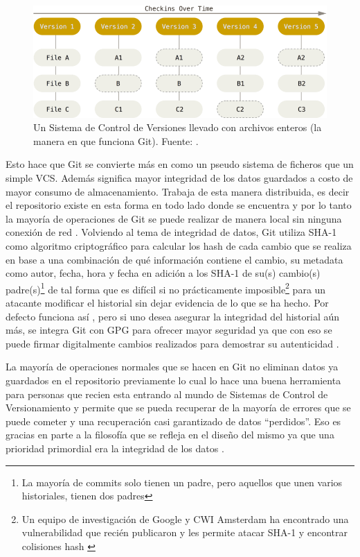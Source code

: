 \begin{figure}
  \begin{center}
      \includegraphics[width=\textwidth]{Figures/vcs-backup.png}
  \end{center}
  \caption{Un Sistema de Control de Versiones llevado con archivos enteros (la manera en que funciona Git). Fuente: \citep{PROGIT-Git-Intro}.}
  \label{VCS-Backup}
\end{figure}

Esto hace que Git se convierte más en como un pseudo sistema de ficheros que un simple VCS. Además significa mayor integridad de los datos guardados a costo de mayor consumo de almacenamiento. Trabaja de esta manera distribuida, es decir el repositorio existe en esta forma en todo lado donde se encuentra y por lo tanto la mayoría de operaciones de Git se puede realizar de manera local sin ninguna conexión de red \citep{PROGIT-Git-Intro}.
Volviendo al tema de integridad de datos, Git utiliza SHA-1 como algoritmo criptográfico para calcular los hash de cada cambio que se realiza en base a una combinación de qué información contiene el cambio, su metadata como autor, fecha, hora y fecha en adición a los SHA-1 de su(s) cambio(s) padre(s)\footnote{La mayoría de commits solo tienen un padre, pero aquellos que unen varios historiales, tienen dos padres} de tal forma que es difícil si no prácticamente imposible\footnote{Un equipo de investigación de Google y CWI Amsterdam ha encontrado una vulnerabilidad que recién publicaron y les permite atacar SHA-1 y encontrar colisiones hash \citep{Shattered-Paper}} para un atacante modificar el historial sin dejar evidencia de lo que se ha hecho. Por defecto funciona así \citep{PROGIT-Git-Intro}, pero si uno desea asegurar la integridad del historial aún más, se integra Git con GPG para ofrecer mayor seguridad ya que con eso se puede firmar digitalmente cambios realizados para demostrar su autenticidad \citep{PROGIT-Git-GPG}.

La mayoría de operaciones normales  que se hacen en Git no eliminan datos ya guardados en el repositorio previamente lo cual lo hace una buena herramienta para personas que recien esta entrando al mundo de Sistemas de Control de Versionamiento y permite que se pueda recuperar de la mayoría de errores que se puede cometer y una recuperación casi garantizado de datos “perdidos”. Eso es gracias en parte a la filosofía que se refleja en el diseño del mismo ya que una prioridad primordial era la integridad de los datos \citep{PROGIT-Git-Intro}.

